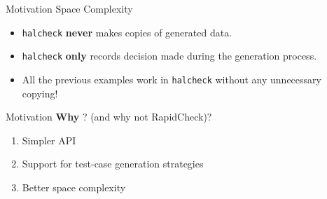 \begin{frame}{\halcheck{} \textemdash{} Motivation \textemdash{} Space Complexity}
  \begin{itemize}
    \item \texttt{halcheck} \textbf{never} makes copies of generated data.
    \item \texttt{halcheck} \textbf{only} records decision made during the generation process.
    \item All the previous examples work in \texttt{halcheck} without any unnecessary copying!
  \end{itemize}
\end{frame}

\begin{frame}{\halcheck{} \textemdash{} Motivation}
  \textbf{Why} \halcheck{}? (and why not RapidCheck)?

  \begin{enumerate}
    \item Simpler API
    \item Support for test-case generation strategies
    \item Better space complexity
          \pause{}
  \end{enumerate}
\end{frame}
